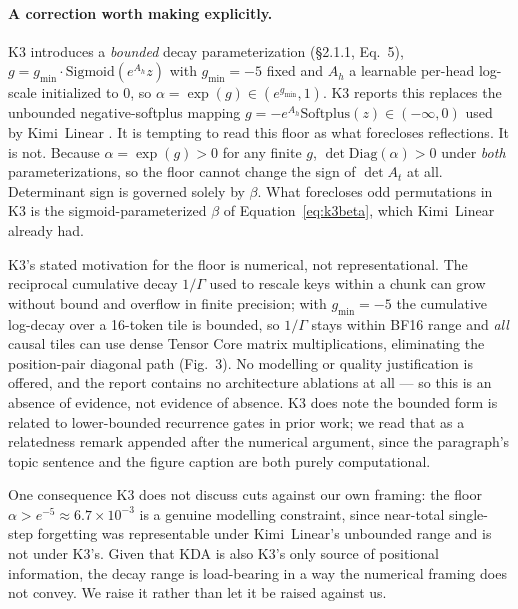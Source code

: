 \documentclass[10pt,twocolumn]{article}
\begin{document}
\paragraph{A correction worth making explicitly.}
K3 introduces a \emph{bounded} decay parameterization (\S2.1.1, Eq.~5),
$g = g_{\min}\!\cdot\!\mathrm{Sigmoid}(e^{A_h} z)$ with $g_{\min}=-5$ fixed and
$A_h$ a learnable per-head log-scale initialized to $0$, so
$\alpha = \exp(g) \in (e^{g_{\min}}, 1)$. K3 reports this replaces the unbounded
negative-softplus mapping $g = -e^{A_h}\mathrm{Softplus}(z) \in (-\infty,0)$
used by Kimi~Linear \cite{kimi2025linear}. It is tempting to read this floor as
what forecloses reflections. It is not. Because $\alpha = \exp(g) > 0$ for any
finite $g$, $\det\mathrm{Diag}(\alpha) > 0$ under \emph{both} parameterizations,
so the floor cannot change the sign of $\det A_t$ at all. Determinant sign is
governed solely by $\beta$. What forecloses odd permutations in K3 is the
sigmoid-parameterized $\beta$ of Equation~\eqref{eq:k3beta}, which Kimi~Linear
already had.

K3's stated motivation for the floor is numerical, not representational. The
reciprocal cumulative decay $1/\Gamma$ used to rescale keys within a chunk can
grow without bound and overflow in finite precision; with $g_{\min}=-5$ the
cumulative log-decay over a 16-token tile is bounded, so $1/\Gamma$ stays within
BF16 range and \emph{all} causal tiles can use dense Tensor Core matrix
multiplications, eliminating the position-pair diagonal path (Fig.~3). No
modelling or quality justification is offered, and the report contains no
architecture ablations at all --- so this is an absence of evidence, not
evidence of absence. K3 does note the bounded form is related to lower-bounded
recurrence gates in prior work; we read that as a relatedness remark appended
after the numerical argument, since the paragraph's topic sentence and the
figure caption are both purely computational.

One consequence K3 does not discuss cuts against our own framing: the floor
$\alpha > e^{-5} \approx 6.7\times10^{-3}$ is a genuine modelling constraint,
since near-total single-step forgetting was representable under Kimi~Linear's
unbounded range and is not under K3's. Given that KDA is also K3's only source
of positional information, the decay range is load-bearing in a way the
numerical framing does not convey. We raise it rather than let it be raised
against us.

\end{document}
